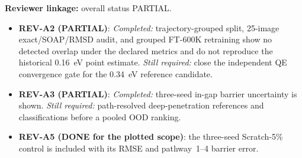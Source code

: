 \textbf{Reviewer linkage:} overall status PARTIAL.
\begin{itemize}[leftmargin=1.4em,noitemsep]
\item \textbf{REV-A2 (PARTIAL)}: \emph{Completed:} trajectory-grouped split, 25-image exact/SOAP/RMSD audit, and grouped FT-600K retraining show no detected overlap under the declared metrics and do not reproduce the historical 0.16~eV point estimate. \emph{Still required:} close the independent QE convergence gate for the 0.34~eV reference candidate.
\item \textbf{REV-A3 (PARTIAL)}: \emph{Completed:} three-seed in-gap barrier uncertainty is shown. \emph{Still required:} path-resolved deep-penetration references and classifications before a pooled OOD ranking.
\item \textbf{REV-A5 (DONE for the plotted scope)}: the three-seed Scratch-5\% control is included with its RMSE and pathway~1--4 barrier error.
\end{itemize}
